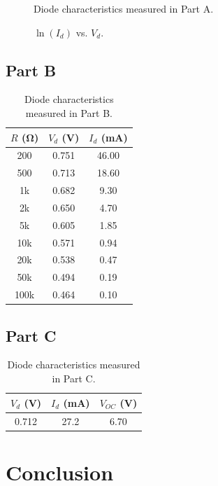 \documentclass{article}
\begin{document}
\begin{figure}[hbtp]
  \centering
  
  \caption{\label{fig:part_a_graph} Diode characteristics measured in Part A.}
\end{figure}

\begin{figure}[hbtp]
  \centering
  
  \caption{\label{fig:part_a_graph2} $\ln{(I_d)}$ vs. $V_d$.}
\end{figure}

\subsection{Part B}
\label{sec:result_b}

\begin{table}[hbtp]
  \centering
  \begin{tabular}{ccc}
    $R$ (\si{\ohm}) & $V_d$ (\si{V}) & $I_d$ (\si{mA}) \\
    \hline
    200 & 0.751 & 46.00 \\
    500 & 0.713 & 18.60 \\
    1k & 0.682 & 9.30 \\
    2k & 0.650 & 4.70 \\
    5k & 0.605 & 1.85 \\
    10k & 0.571 & 0.94 \\
    20k & 0.538 & 0.47 \\
    50k & 0.494 & 0.19 \\
    100k & 0.464 & 0.10 \\
  \end{tabular}
  \caption{\label{tab:part_b} Diode characteristics measured in Part B.}
\end{table}

\subsection{Part C}
\label{sec:result_c}

\begin{table}[hbtp]
  \centering
  \begin{tabular}{ccc}
    $V_d$ (\si{V}) & $I_d$ (\si{mA}) & $V_{OC}$ (\si{V}) \\
    \hline
    0.712 & 27.2 & 6.70 \\
  \end{tabular}
  \caption{\label{tab:part_b} Diode characteristics measured in Part C.}
\end{table}

\section{Conclusion}
\label{sec:conclusion}
\end{document}
